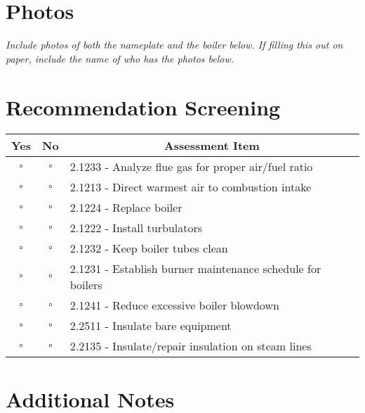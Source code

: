 \documentclass[./main.tex]{subfiles}
\begin{document}
\vspace{4cm}

\clearpage \section*{Photos}
\emph{Include photos of both the nameplate and the boiler below. If filling this out on paper, include the name of who has the photos below. }

\vspace{6cm}


\section*{Recommendation Screening}
\begin{tabular}{|c|c|p{13.5cm}|}
\hline
\multicolumn{1}{|c|}{\textbf{Yes}} & \multicolumn{1}{c|}{\textbf{No}} & \multicolumn{1}{c|}{\textbf{Assessment Item}} \\
\hline
$\square$ & $\square$ & 2.1233 - Analyze flue gas for proper air/fuel ratio \\
\hline
$\square$ & $\square$ & 2.1213 - Direct warmest air to combustion intake \\
\hline
$\square$ & $\square$ & 2.1224 - Replace boiler \\
\hline
$\square$ & $\square$ & 2.1222 - Install turbulators \\
\hline
$\square$ & $\square$ & 2.1232 - Keep boiler tubes clean \\
\hline
$\square$ & $\square$ & 2.1231 - Establish burner maintenance schedule for boilers \\
\hline
$\square$ & $\square$ & 2.1241 - Reduce excessive boiler blowdown \\
\hline
$\square$ & $\square$ & 2.2511 - Insulate bare equipment \\
\hline
$\square$ & $\square$ & 2.2135 - Insulate/repair insulation on steam lines \\
\hline
\end{tabular}

\section*{Additional Notes}
\vspace{4cm}



\end{document}
